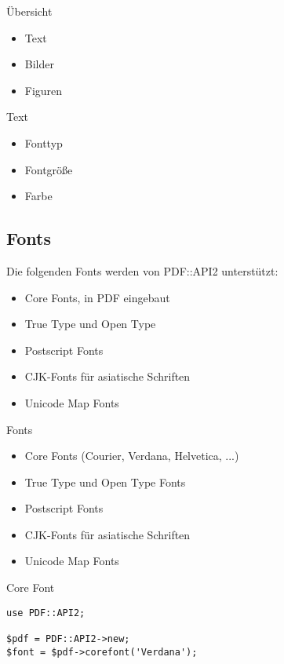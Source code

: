 
\begin{frame}{Übersicht}
\begin{itemize}
\item Text
\item Bilder
\item Figuren
\end{itemize}
\end{frame}

\begin{frame}{Text}
\begin{itemize}
\item Fonttyp
\item Fontgröße
\item Farbe
\end{itemize}
\end{frame}

\subsection{Fonts}

Die folgenden Fonts werden von PDF::API2
unterstützt:


\begin{itemize}
\item Core Fonts, in PDF eingebaut
\item True Type und Open Type
\item Postscript Fonts
\item CJK-Fonts für asiatische Schriften
\item Unicode Map Fonts
\end{itemize}

\begin{frame}{Fonts}
\begin{itemize}
\item Core Fonts (Courier, Verdana, Helvetica, ...)
\item True Type und Open Type Fonts
\item Postscript Fonts
\item CJK-Fonts für asiatische Schriften
\item Unicode Map Fonts
\end{itemize}
\end{frame}

\begin{frame}[fragile]{Core Font}
\begin{lstlisting}
use PDF::API2;

$pdf = PDF::API2->new;
$font = $pdf->corefont('Verdana');
\end{lstlisting}
\end{frame}

